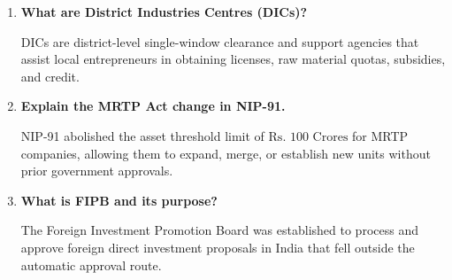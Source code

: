 \documentclass[12pt,a4paper]{article}
\newcommand{\Q}[1]{\textbf{#1}\par\noindent\ignorespaces}
\begin{document}
\begin{tcolorbox}[exambox, title={\textbf{Frequently Asked / Viva Questions}}]
\begin{enumerate}[topsep=0pt, label=\textbf{Q\arabic*.}, itemsep=5pt]
  \item \Q{What are District Industries Centres (DICs)?}
    DICs are district-level single-window clearance and support agencies that assist local entrepreneurs in obtaining licenses, raw material quotas, subsidies, and credit.
  \item \Q{Explain the MRTP Act change in NIP-91.}
    NIP-91 abolished the asset threshold limit of $\text{Rs. } 100\text{ Crores}$ for MRTP companies, allowing them to expand, merge, or establish new units without prior government approvals.
  \item \Q{What is FIPB and its purpose?}
    The Foreign Investment Promotion Board was established to process and approve foreign direct investment proposals in India that fell outside the automatic approval route.
  \end{enumerate}
\end{tcolorbox}
\end{document}
